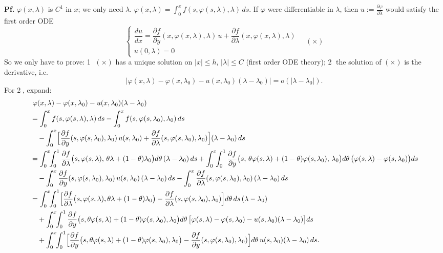 \documentclass[11pt]{article}
\theoremstyle{definition}
\theoremstyle{remark}
\begin{document}
\textbf{Pf.} $\varphi(x, \lambda)$ is $C^1$ in $x$; we only need $\lambda$.
$\varphi(x, \lambda) = \int_0^x f(s, \varphi(s, \lambda), \lambda)\, ds$. If $\varphi$ were
differentiable in $\lambda$, then $u := \frac{\partial \varphi}{\partial \lambda}$ would satisfy
the first order ODE
\begin{equation}
\begin{cases} \dfrac{du}{dx} = \dfrac{\partial f}{\partial y}(x, \varphi(x,\lambda), \lambda)\, u
+ \dfrac{\partial f}{\partial \lambda}(x, \varphi(x,\lambda), \lambda) \\ u(0, \lambda) = 0 \end{cases}
\quad (\times)
\end{equation}
So we only have to prove: \textcircled{1} $(\times)$ has a unique solution on $|x| \le h$, $|\lambda| \le C$
(first order ODE theory); \textcircled{2} the solution of $(\times)$ is the derivative, i.e.
\[
| \varphi(x, \lambda) - \varphi(x, \lambda_0) - u(x, \lambda_0)(\lambda - \lambda_0) | = o(|\lambda - \lambda_0|).
\]
For \textcircled{2}, expand:
\begin{align*}
&\ \varphi(x, \lambda) - \varphi(x, \lambda_0) - u(x, \lambda_0)(\lambda - \lambda_0)\\
&= \int_0^x f(s, \varphi(s, \lambda), \lambda)\, ds - \int_0^x f(s, \varphi(s, \lambda_0), \lambda_0)\, ds\\
&\quad - \int_0^x \Bigl[ \frac{\partial f}{\partial y}(s, \varphi(s, \lambda_0), \lambda_0)\, u(s, \lambda_0)
+ \frac{\partial f}{\partial \lambda}(s, \varphi(s, \lambda_0), \lambda_0) \Bigr] (\lambda - \lambda_0)\, ds\\
&= \int_0^x \!\!\int_0^1 \frac{\partial f}{\partial \lambda}\bigl(s, \varphi(s, \lambda),\, \theta\lambda + (1-\theta)\lambda_0\bigr) d\theta\,(\lambda - \lambda_0)\, ds
+ \int_0^x \!\!\int_0^1 \frac{\partial f}{\partial y}\bigl(s,\, \theta\varphi(s, \lambda) + (1-\theta)\varphi(s, \lambda_0),\, \lambda_0\bigr) d\theta\,\bigl(\varphi(s, \lambda) - \varphi(s, \lambda_0)\bigr) ds\\
&\quad - \int_0^x \frac{\partial f}{\partial y}(s, \varphi(s, \lambda_0), \lambda_0)\, u(s, \lambda_0)\, (\lambda - \lambda_0)\, ds
- \int_0^x \frac{\partial f}{\partial \lambda}(s, \varphi(s, \lambda_0), \lambda_0)\, (\lambda - \lambda_0)\, ds\\
&= \int_0^x \!\!\int_0^1 \Bigl[ \frac{\partial f}{\partial \lambda}\bigl(s, \varphi(s, \lambda), \theta\lambda + (1-\theta)\lambda_0\bigr) - \frac{\partial f}{\partial \lambda}(s, \varphi(s, \lambda_0), \lambda_0) \Bigr] d\theta\, ds\,(\lambda - \lambda_0)\\
&\quad + \int_0^x \!\!\int_0^1 \frac{\partial f}{\partial y}\bigl(s, \theta\varphi(s, \lambda) + (1-\theta)\varphi(s, \lambda_0), \lambda_0\bigr) d\theta\,
\bigl[ \varphi(s, \lambda) - \varphi(s, \lambda_0) - u(s, \lambda_0)(\lambda - \lambda_0) \bigr] ds\\
&\quad + \int_0^x \!\!\int_0^1 \Bigl[ \frac{\partial f}{\partial y}\bigl(s, \theta\varphi(s, \lambda) + (1-\theta)\varphi(s, \lambda_0), \lambda_0\bigr) - \frac{\partial f}{\partial y}(s, \varphi(s, \lambda_0), \lambda_0) \Bigr] d\theta\, u(s, \lambda_0)(\lambda - \lambda_0)\, ds.
\end{align*}
\end{document}
